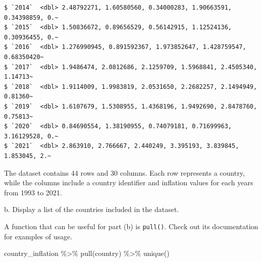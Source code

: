 \documentclass[
  letterpaper,
  DIV=11,
  numbers=noendperiod]{scrartcl}
\newenvironment{Shaded}{\begin{snugshade}}{\end{snugshade}}
\newcommand{\FunctionTok}[1]{\textcolor[rgb]{0.28,0.35,0.67}{#1}}
\newcommand{\NormalTok}[1]{\textcolor[rgb]{0.00,0.23,0.31}{#1}}
\newcommand{\SpecialCharTok}[1]{\textcolor[rgb]{0.37,0.37,0.37}{#1}}
\begin{document}
\begin{enumerate}
\begin{verbatim}
$ `2014`  <dbl> 2.48792271, 1.60580560, 0.34000283, 1.90663591, 0.34398859, 0.~
$ `2015`  <dbl> 1.50836672, 0.89656529, 0.56142915, 1.12524136, 0.30936455, 0.~
$ `2016`  <dbl> 1.276990945, 0.891592367, 1.973852647, 1.428759547, 0.68350420~
$ `2017`  <dbl> 1.9486474, 2.0812686, 2.1259709, 1.5968841, 2.4505340, 1.14713~
$ `2018`  <dbl> 1.9114009, 1.9983819, 2.0531650, 2.2682257, 2.1494949, 0.81360~
$ `2019`  <dbl> 1.6107679, 1.5308955, 1.4368196, 1.9492690, 2.8478760, 0.75813~
$ `2020`  <dbl> 0.84690554, 1.38190955, 0.74079181, 0.71699963, 3.16129528, 0.~
$ `2021`  <dbl> 2.863910, 2.766667, 2.440249, 3.395193, 3.839845, 1.853045, 2.~
\end{verbatim}
\end{enumerate}

The dataset contains 44 rows and 30 columns. Each row represents a
country, while the columns include a country identifier and inflation
values for each years from 1993 to 2021.

b. Display a list of the countries included in the dataset.

\begin{tcolorbox}[enhanced jigsaw, toptitle=1mm, bottomrule=.15mm, colbacktitle=quarto-callout-tip-color!10!white, colframe=quarto-callout-tip-color-frame, leftrule=.75mm, breakable, toprule=.15mm, colback=white, arc=.35mm, coltitle=black, left=2mm, opacitybacktitle=0.6, bottomtitle=1mm, opacityback=0, title=\textcolor{quarto-callout-tip-color}{\faLightbulb}\hspace{0.5em}{Tip}, titlerule=0mm, rightrule=.15mm]

A function that can be useful for part (b) is \texttt{pull()}. Check out
its documentation for examples of usage.

\end{tcolorbox}

\begin{Shaded}
\begin{Highlighting}[]
\NormalTok{country\_inflation }\SpecialCharTok{\%\textgreater{}\%}
  \FunctionTok{pull}\NormalTok{(country) }\SpecialCharTok{\%\textgreater{}\%}
  \FunctionTok{unique}\NormalTok{()}
\end{Highlighting}
\end{Shaded}
\end{document}
